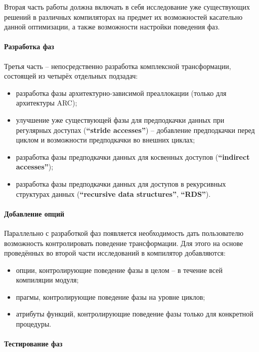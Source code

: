 \documentclass[12pt,a4paper,oneside]{article}
\begin{document}
Вторая часть работы должна включать в себя исследование уже существующих решений в различных компиляторах на предмет их возможностей касательно данной оптимизации, а также возможности настройки поведения фаз.

\paragraph{Разработка фаз}

Третья часть -- непосредственно разработка комплексной трансформации, состоящей из четырёх отдельных подзадач:
\begin{itemize}
\item разработка фазы архитектурно-зависимой преаллокации (только для архитектуры ARC);
\item улучшение уже существующей фазы для предподкачки данных при регулярных доступах (\textbf{``stride accesses''}) -- добавление предподкачки перед циклом и возможности предподкачки во внешних циклах;
\item разработка фазы предподкачки данных для косвенных доступов (\textbf{``indirect accesses''});
\item разработка фазы предподкачки данных для доступов в рекурсивных структурах данных (\textbf{``recursive data structures''}, \textbf{``RDS''}).
\end{itemize}

\paragraph{Добавление опций}

Параллельно с разработкой фаз появляется необходимость дать пользователю возможность контролировать поведение трансформации. Для этого на основе проведённых во второй части исследований в компилятор добавляются:

\begin{itemize}
\item опции, контролирующие поведение фазы в целом -- в течение всей компиляции модуля;
\item прагмы, контролирующие поведение фазы на уровне циклов;
\item атрибуты функций, контролирующие поведение фазы только для конкретной процедуры.
\end{itemize}

\paragraph{Тестирование фаз}
\end{document}
